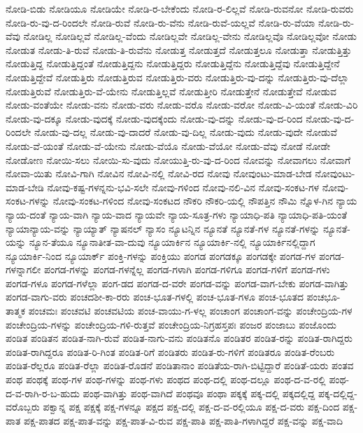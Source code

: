 {ನೋಡಿ-ಬಿಡು
ನೋಡಿಯೂ
ನೋಡಿಯೇ
ನೋಡಿ-ರ-ಬೇಕೆಂದು
ನೋಡಿ-ರ-ಲಿಲ್ಲವೆ
ನೋಡಿ-ರುವನೋ
ನೋಡಿ-ರುವರು
ನೋಡಿ-ರು-ವು-ದ-ರಿಂದಲೇ
ನೋಡಿ-ರುವೆ
ನೋಡಿ-ರು-ವೆನು
ನೋಡಿ-ರುವೆ-ಯಲ್ಲವೆ
ನೋಡಿ-ರು-ವೆಯಾ
ನೋಡಿ-ರು-ವೆವು
ನೋಡಿಲ್ಲ
ನೋಡಿಲ್ಲವೆ
ನೋಡಿಲ್ಲ-ವೆಂದು
ನೋಡಿಲ್ಲವೇ
ನೋಡಿಲ್ಲ-ವೇನು
ನೋಡಿಲ್ಲವೊ
ನೋಡಿಲ್ಲವೋ
ನೋಡು
ನೋಡುತ
ನೋಡು-ತಿ-ರುವೆ
ನೋಡು-ತಿ-ರುವೆನು
ನೋಡುತ್ತ
ನೋಡುತ್ತದೆ
ನೋಡುತ್ತಲೂ
ನೋಡುತ್ತಾ
ನೋಡುತ್ತಿತ್ತು
ನೋಡುತ್ತಿದ್ದ
ನೋಡುತ್ತಿದ್ದಂತೆ
ನೋಡುತ್ತಿದ್ದನು
ನೋಡುತ್ತಿದ್ದರು
ನೋಡುತ್ತಿದ್ದೆನು
ನೋಡುತ್ತಿದ್ದೆವು
ನೋಡುತ್ತಿದ್ದೇನೆ
ನೋಡುತ್ತಿದ್ದೇವೆ
ನೋಡುತ್ತಿರು
ನೋಡುತ್ತಿರುವ
ನೋಡುತ್ತಿರು-ವರು
ನೋಡುತ್ತಿರು-ವು-ದನ್ನು
ನೋಡುತ್ತಿರು-ವು-ದೆಲ್ಲಾ
ನೋಡುತ್ತಿರುವೆ
ನೋಡುತ್ತಿರು-ವೆ-ಯೇನು
ನೋಡುತ್ತಿಲ್ಲವೆ
ನೋಡುತ್ತೀರಿ
ನೋಡುತ್ತೇನೆ
ನೋಡುತ್ತೇವೆ
ನೋಡುವ
ನೋಡು-ವಂತೆಯೇ
ನೋಡು-ವನು
ನೋಡು-ವರು
ನೋಡು-ವರೊ
ನೋಡು-ವರೋ
ನೋಡು-ವಿ-ಯಂತೆ
ನೋಡು-ವಿರಿ
ನೋಡು-ವು-ದಕ್ಕೂ
ನೋಡು-ವುದಕ್ಕೆ
ನೋಡು-ವುದಕ್ಕೆಂದು
ನೋಡು-ವು-ದನ್ನು
ನೋಡು-ವು-ದ-ರಿಂದ
ನೋಡು-ವು-ದ-ರಿಂದಲೇ
ನೋಡು-ವು-ದಲ್ಲ
ನೋಡು-ವು-ದಾದರೆ
ನೋಡು-ವು-ದಿಲ್ಲ
ನೋಡು-ವುದು
ನೋಡು-ವುದೇ
ನೋಡುವೆ
ನೋಡು-ವೆ-ಯಂತೆ
ನೋಡು-ವೆ-ಯೇನು
ನೋಡು-ವೆಯೊ
ನೋಡು-ವೆಯೋ
ನೋಡು-ವೆವು
ನೋಡೆ
ನೋಡೇ
ನೋಡೋಣ
ನೋಯಿ-ಸಲು
ನೋಯಿ-ಸು-ವುದು
ನೋಯುತ್ತಿ-ರು-ವು-ದ-ರಿಂದ
ನೋವನ್ನು
ನೋವಾಗಲು
ನೋವಾಗೆ
ನೋವಾ-ಯಿತು
ನೋವಿ-ಗಾಗಿ
ನೋವಿನ
ನೋವಿ-ನಲ್ಲಿ
ನೋವಿ-ರದ
ನೋವು
ನೋವುಂಟು-ಮಾಡ-ಬೇಡ
ನೋವುಂಟು-ಮಾಡ-ಬೇಡಿ
ನೋವು-ಕಷ್ಟ-ಗಳನ್ನನು-ಭವಿ-ಸಲೇ
ನೋವು-ಗಳಿಂದ
ನೋವು-ನಲಿ-ವಿನ
ನೋವು-ಸಂಕಟ-ಗಳ
ನೋವು-ಸಂಕಟ-ಗಳನ್ನು
ನೋವು-ಸಂಕಟ-ಗಳಿಂದ
ನೋವು-ಸಂಕಟದ
ನೌಕರಿ
ನೌಕರಿ-ಯಲ್ಲಿ
ನೌಪತ್ತಿನ
ನೌಮಿ
ನ್ನೊಳ-ಗಿನ
ನ್ಯಾಯ
ನ್ಯಾಯ-ದಂತೆ
ನ್ಯಾಯ-ವಾಗಿ
ನ್ಯಾಯ-ವಾದ
ನ್ಯಾಯವೇ
ನ್ಯಾಯ-ಸೂತ್ರ-ಗಳು
ನ್ಯಾಯಾಧಿ-ಪತಿ
ನ್ಯಾಯಾಧಿ-ಪತಿ-ಯಂತೆ
ನ್ಯಾಯಾನ್ಯಾಯ-ವನ್ನು
ನ್ಯಾಯ್ಯಾತ್
ನ್ಯಾಷನಲ್
ನ್ಯಾಸಂ
ನ್ಯೂಟನ್ನಿನ
ನ್ಯೂನತೆ
ನ್ಯೂನತೆ-ಗಳ
ನ್ಯೂನತೆ-ಗಳನ್ನು
ನ್ಯೂನತೆ-ಯನ್ನು
ನ್ಯೂನ-ತೆಯೂ
ನ್ಯೂನಾತೀತ-ವಾ-ದುವು
ನ್ಯೂಯಾರ್ಕಿನ
ನ್ಯೂಯಾರ್ಕಿ-ನಲ್ಲಿ
ನ್ಯೂಯಾರ್ಕಿನಲ್ಲಿದ್ದಾಗ
ನ್ಯೂಯಾರ್ಕಿ-ನಿಂದ
ನ್ಯೂಯಾರ್ಕ್
ಪಂಕ್ತಿ-ಗಳನ್ನು
ಪಂಕ್ತಿಯು
ಪಂಗಡ
ಪಂಗಡಕ್ಕೂ
ಪಂಗಡಕ್ಕೇ
ಪಂಗಡ-ಗಳ
ಪಂಗಡ-ಗಳನ್ನಾಗಲೀ
ಪಂಗಡ-ಗಳನ್ನು
ಪಂಗಡ-ಗಳನ್ನೆಲ್ಲ
ಪಂಗಡ-ಗಳಾಗಿ
ಪಂಗಡ-ಗಳಿಗೂ
ಪಂಗಡ-ಗಳಿಗೆ
ಪಂಗಡ-ಗಳು
ಪಂಗಡ-ಗಳೂ
ಪಂಗಡ-ಗಳೆಲ್ಲಾ
ಪಂಗ-ಡದ
ಪಂಗಡ-ದ-ವರೇ
ಪಂಗಡ-ವನ್ನು
ಪಂಗಡ-ವಾಗ-ಬೇಕು
ಪಂಗಡ-ವಾಗಿತ್ತು
ಪಂಗಡ-ವಾಗು-ವರು
ಪಂಚದಶೀ-ಕಾ-ರರು
ಪಂಚ-ಭೂತ-ಗಳಲ್ಲಿ
ಪಂಚ-ಭೂತ-ಗಳೂ
ಪಂಚ-ಭೂತದ
ಪಂಚಭೂ-ತಾತ್ಮಕ
ಪಂಚಮಃ
ಪಂಚವಟಿ
ಪಂಚವಟಿಯ
ಪಂಚ-ವಾಯು-ಗ-ಳಲ್ಲ
ಪಂಚಾಂಗ
ಪಂಚಾಂಗ-ವನ್ನು
ಪಂಚೇಂದ್ರಿಯ-ಗಳ
ಪಂಚೇಂದ್ರಿಯ-ಗಳನ್ನು
ಪಂಚೇಂದ್ರಿಯ-ಗಳಿ-ರುತ್ತವೆ
ಪಂಚೇಂದ್ರಿಯ-ನಿಗ್ರಹಸ್ತಪಃ
ಪಂಜರ
ಪಂಜಾಬು
ಪಂಜೊಂದು
ಪಂಡಿತ
ಪಂಡಿತನ
ಪಂಡಿತ-ನಾಗಿ-ರುವೆ
ಪಂಡಿತ-ನಾಗು-ವನು
ಪಂಡಿತನೊ
ಪಂಡಿತರ
ಪಂಡಿತ-ರನ್ನು
ಪಂಡಿತ-ರಾಗಿದ್ದರು
ಪಂಡಿತ-ರಾಗಿದ್ದರೂ
ಪಂಡಿತ-ರಿ-ಗಿಂತ
ಪಂಡಿತ-ರಿಗೆ
ಪಂಡಿತರು
ಪಂಡಿತ-ರು-ಗಳಿಗೆ
ಪಂಡಿತರೂ
ಪಂಡಿತ-ರೆಂಬರು
ಪಂಡಿತ-ರೆಲ್ಲರೂ
ಪಂಡಿತ-ರೆಲ್ಲಾ
ಪಂಡಿತ-ರೊಡನೆ
ಪಂಡಿತಾನಾಂ
ಪಂಡಿತೆಯ-ರಾಗಿ-ಬಿಟ್ಟಿದ್ದಾರೆ
ಪಂಡಿತೆ-ಯರು
ಪಂತವ
ಪಂಥ
ಪಂಥಕ್ಕೆ
ಪಂಥ-ಗಳ
ಪಂಥ-ಗಳನ್ನು
ಪಂಥ-ಗಳು
ಪಂಥದ
ಪಂಥ-ದಲ್ಲಿ
ಪಂಥ-ದಲ್ಲೂ
ಪಂಥ-ದ-ವ-ರಲ್ಲಿ
ಪಂಥ-ದ-ವ-ರಾಗಿ-ರ-ಬ-ಹುದು
ಪಂಥ-ವಾಗಿತ್ತು
ಪಂಥ-ವಾಗಿದೆ
ಪಂಥವೂ
ಪಂಥಾ
ಪಕ್ಕಕ್ಕೆ
ಪಕ್ಕ-ದಲ್ಲಿ
ಪಕ್ಕದಲ್ಲಿದ್ದ
ಪಕ್ಕ-ದಲ್ಲಿದ್ದ-ವರೊಬ್ಬರು
ಪಕ್ವಾನ್ನ
ಪಕ್ಷ
ಪಕ್ಷಕ್ಕೆ
ಪಕ್ಷ-ಗಳನ್ನೂ
ಪಕ್ಷದ
ಪಕ್ಷ-ದಲ್ಲಿ
ಪಕ್ಷ-ದ-ವ-ರಲ್ಲಿಯೂ
ಪಕ್ಷ-ದ-ವರು
ಪಕ್ಷ-ದಿಂದ
ಪಕ್ಷ-ಪಾತ
ಪಕ್ಷ-ಪಾತದ
ಪಕ್ಷ-ಪಾತ-ವನ್ನು
ಪಕ್ಷ-ಪಾತ-ವಿ-ರುವ
ಪಕ್ಷ-ಪಾತಿ
ಪಕ್ಷ-ಪಾತಿ-ಗಳಾಗಿದ್ದರೆ
ಪಕ್ಷ-ವನ್ನು
ಪಕ್ಷ-ವಾದಿ
}
